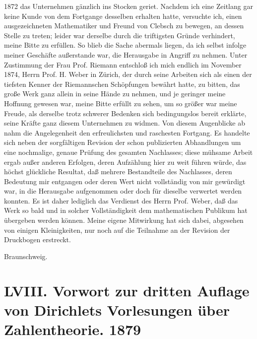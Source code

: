 \documentclass[11pt]{article}
\newcommand{\origpage}[1]{\par\vspace{0.25em}\noindent{\footnotesize\itshape [Gedruckte Seite #1]}\par\vspace{0.25em}}
\begin{document}
\origpage{423}
1872 das Unternehmen gänzlich ins Stocken geriet. Nachdem ich eine Zeitlang gar keine Kunde von dem Fortgange desselben erhalten hatte, versuchte ich, einen ausgezeichneten Mathematiker und Freund von Clebsch zu bewegen, an dessen Stelle zu treten; leider war derselbe durch die triftigsten Gründe verhindert, meine Bitte zu erfüllen. So blieb die Sache abermals liegen, da ich selbst infolge meiner Geschäfte außerstande war, die Herausgabe in Angriff zu nehmen. Unter Zustimmung der Frau Prof. Riemann entschloß ich mich endlich im November 1874, Herrn Prof. H. Weber in Zürich, der durch seine Arbeiten sich als einen der tiefsten Kenner der Riemannschen Schöpfungen bewährt hatte, zu bitten, das große Werk ganz allein in seine Hände zu nehmen, und je geringer meine Hoffnung gewesen war, meine Bitte erfüllt zu sehen, um so größer war meine Freude, als derselbe trotz schwerer Bedenken sich bedingungslos bereit erklärte, seine Kräfte ganz diesem Unternehmen zu widmen. Von diesem Augenblicke ab nahm die Angelegenheit den erfreulichsten und raschesten Fortgang. Es handelte sich neben der sorgfältigen Revision der schon publizierten Abhandlungen um eine nochmalige, genaue Prüfung des gesamten Nachlasses; diese mühsame Arbeit ergab außer anderen Erfolgen, deren Aufzählung hier zu weit führen würde, das höchst glückliche Resultat, daß mehrere Bestandteile des Nachlasses, deren Bedeutung mir entgangen oder deren Wert nicht vollständig von mir gewürdigt war, in die Herausgabe aufgenommen oder doch für dieselbe verwertet werden konnten. Es ist daher lediglich das Verdienst des Herrn Prof. Weber, daß das Werk so bald und in solcher Vollständigkeit dem mathematischen Publikum hat übergeben werden können. Meine eigene Mitwirkung hat sich dabei, abgesehen von einigen Kleinigkeiten, nur noch auf die Teilnahme an der Revision der Druckbogen erstreckt.

\begin{flushleft}Braunschweig.\end{flushleft}

\origpage{424}
\section*{LVIII. Vorwort zur dritten Auflage von Dirichlets Vorlesungen über Zahlentheorie. 1879}
\end{document}

